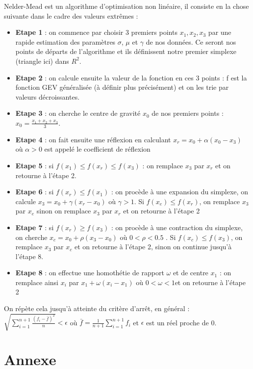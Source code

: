 \documentclass{article}
\begin{document}
\noindent Nelder-Mead est un algorithme d'optimisation non linéaire, il consiste en la chose suivante dans le cadre des valeurs extrêmes : 
\begin{itemize}
	\item \textbf{Etape 1} : on commence par choisir 3 premiers points $x_1, x_2, x_3$ par une rapide estimation des paramètres $\sigma$, $\mu$ et $\gamma$ de nos données. Ce seront nos points de départs de l'algorithme et ils définissent notre premier simplexe (triangle ici) dans $R^2$.
	\item \textbf{Etape 2} : on calcule ensuite la valeur de la fonction en ces 3 points : f est la fonction GEV généralisée (à définir plus précisément) et on les trie par valeurs décroissantes.
	\item \textbf{Etape 3} : on cherche le centre de gravité $x_0$ de nos premiers points : $x_0 = \frac{x_1 + x_2 + x_3}{3}$.
	\item \textbf{Etape 4} : on fait ensuite une réflexion en calculant $x_r = x_0 + \alpha (x_0 - x_3)$ où $\alpha > 0$ est appelé le coefficient de réflexion
	\item \textbf{Etape 5} : si $f(x_1) \le  f(x_r) \le  f(x_3)$ : on remplace $x_3$ par $x_r$ et on retourne à l'étape 2.
	\item \textbf{Etape 6} : si $f(x_r) \le  f(x_1)$ : on procède à une expansion du simplexe, on calcule $x_3 = x_0 + \gamma(x_r - x_0)$ où $\gamma > 1$. Si $f(x_e) \le  f(x_r) $, on remplace $x_3$ par $x_e$ sinon on remplace $x_3$ par $x_r$ et on retourne à l'étape 2
	\item \textbf{Etape 7} : si $f(x_r) \geq f(x_3)$ : on procède à une contraction du simplexe, on cherche $x_c = x_0 + \rho(x_3 - x_0)$ où $0 < \rho < 0.5 $ . Si $f(x_c) \le  f(x_3)$, on remplace $x_3$ par $x_c$ et on retourne à l'étape 2, sinon on continue jusqu'à l'étape 8.
	\item \textbf{Etape 8} : on effectue une homothétie de rapport $\omega$ et de centre $x_1$ : on remplace ainsi $x_i$ par $x_1 + \omega(x_i - x_1)$ où $0 < \omega < 1$et on retourne à l'étape 2
\end{itemize}

\noindent On répète cela jusqu'à atteinte du critère d'arrêt, en général : $ \sqrt{\sum_{i=1}^{n+1}  \frac{(f_i - \bar{f})^2}{n}} < \epsilon $ où $\bar{f} =\frac{1}{n+1} \sum_{i=1}^{n+1} f_i $ et $ \epsilon $ est un réel proche de 0. \\

\newpage
\section{Annexe}
\end{document}
